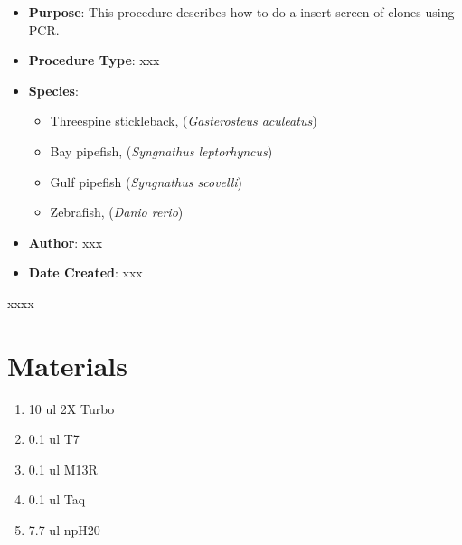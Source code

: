 \documentclass[
  letterpaper,
  DIV=11,
  numbers=noendperiod]{scrreprt}
\providecommand{\tightlist}{%
  \setlength{\itemsep}{0pt}\setlength{\parskip}{0pt}}\usepackage{longtable,booktabs,array}
\begin{document}
\begin{itemize}
\tightlist
\item
  \textbf{Purpose}: This procedure describes how to do a insert screen
  of clones using PCR.
\item
  \textbf{Procedure Type}: xxx
\item
  \textbf{Species}:

  \begin{itemize}
  \tightlist
  \item
    Threespine stickleback, (\emph{Gasterosteus aculeatus})
  \item
    Bay pipefish, (\emph{Syngnathus leptorhyncus})
  \item
    Gulf pipefish (\emph{Syngnathus scovelli})
  \item
    Zebrafish, (\emph{Danio rerio})
  \end{itemize}
\item
  \textbf{Author}: xxx
\item
  \textbf{Date Created}: xxx
\end{itemize}

\begin{tcolorbox}[enhanced jigsaw, rightrule=.15mm, title=\textcolor{quarto-callout-warning-color}{\faExclamationTriangle}\hspace{0.5em}{NOTES}, titlerule=0mm, opacitybacktitle=0.6, toprule=.15mm, bottomrule=.15mm, opacityback=0, left=2mm, colframe=quarto-callout-warning-color-frame, breakable, coltitle=black, colback=white, colbacktitle=quarto-callout-warning-color!10!white, bottomtitle=1mm, leftrule=.75mm, toptitle=1mm, arc=.35mm]

xxxx

\end{tcolorbox}

\hypertarget{materials-21}{%
\section{Materials}\label{materials-21}}

\begin{enumerate}
\def\labelenumi{\arabic{enumi}.}
\tightlist
\item
  10 ul 2X Turbo
\item
  0.1 ul T7
\item
  0.1 ul M13R
\item
  0.1 ul Taq
\item
  7.7 ul npH20
\end{enumerate}
\end{document}
